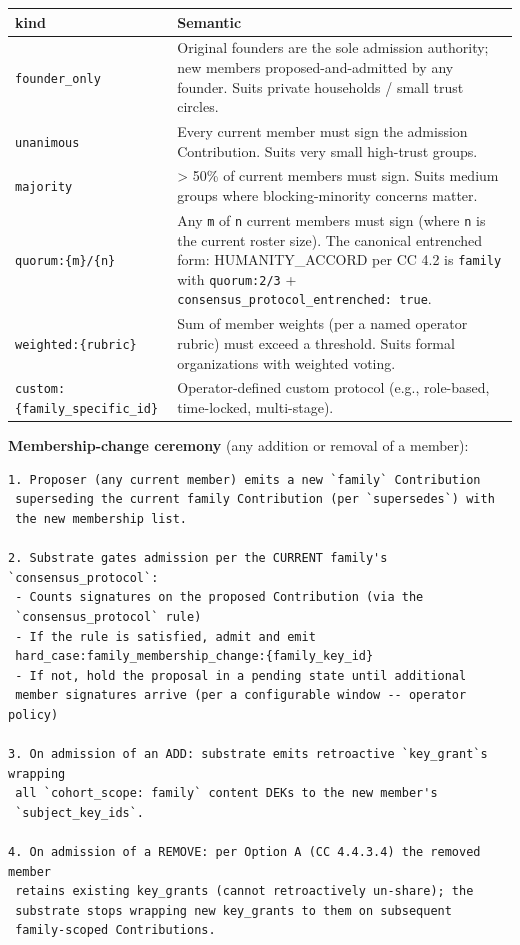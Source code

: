 \documentclass[11pt]{article}
\begin{document}
{\footnotesize
\begin{longtable}{|p{8.0cm}|p{8.0cm}|}\hline
\textbf{kind} & \textbf{Semantic} \\ \hline\endhead
\texttt{founder\_only} & Original founders are the sole admission authority; new members proposed-and-admitted by any founder. Suits private households / small trust circles. \\ \hline
\texttt{unanimous} & Every current member must sign the admission Contribution. Suits very small high-trust groups. \\ \hline
\texttt{majority} & > 50\% of current members must sign. Suits medium groups where blocking-minority concerns matter. \\ \hline
\texttt{quorum:\{m\}/\{n\}} & Any \texttt{m} of \texttt{n} current members must sign (where \texttt{n} is the current roster size). The canonical entrenched form: HUMANITY\_ACCORD per CC 4.2 is \texttt{family} with \texttt{quorum:2/3} + \texttt{consensus\_protocol\_entrenched: true}. \\ \hline
\texttt{weighted:\{rubric\}} & Sum of member weights (per a named operator rubric) must exceed a threshold. Suits formal organizations with weighted voting. \\ \hline
\texttt{custom:\{family\_specific\_id\}} & Operator-defined custom protocol (e.g., role-based, time-locked, multi-stage). \\ \hline
\end{longtable}}


\textbf{Membership-change ceremony} (any addition or removal of a member):


\begin{lstlisting}
1. Proposer (any current member) emits a new `family` Contribution
 superseding the current family Contribution (per `supersedes`) with
 the new membership list.

2. Substrate gates admission per the CURRENT family's `consensus_protocol`:
 - Counts signatures on the proposed Contribution (via the
 `consensus_protocol` rule)
 - If the rule is satisfied, admit and emit
 hard_case:family_membership_change:{family_key_id}
 - If not, hold the proposal in a pending state until additional
 member signatures arrive (per a configurable window -- operator policy)

3. On admission of an ADD: substrate emits retroactive `key_grant`s wrapping
 all `cohort_scope: family` content DEKs to the new member's
 `subject_key_ids`.

4. On admission of a REMOVE: per Option A (CC 4.4.3.4) the removed member
 retains existing key_grants (cannot retroactively un-share); the
 substrate stops wrapping new key_grants to them on subsequent
 family-scoped Contributions.
\end{lstlisting}
\end{document}
